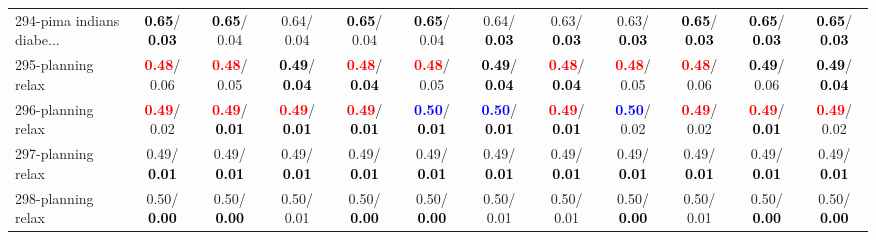 \begin{table}[h]
\begin{center}
{\begin{tabular}{lc|c|c|c|c|c|c|c|c|c|c}
294-pima indians diabe... & \textcolor{black}{\textbf{  0.65}}/\textcolor{black}{\textbf{  0.03}} & \textcolor{black}{\textbf{  0.65}}/  0.04 &   0.64/  0.04 & \textcolor{black}{\textbf{  0.65}}/  0.04 & \textcolor{black}{\textbf{  0.65}}/  0.04 &   0.64/\textcolor{black}{\textbf{  0.03}} &   0.63/\textcolor{black}{\textbf{  0.03}} &   0.63/\textcolor{black}{\textbf{  0.03}} & \textcolor{black}{\textbf{  0.65}}/\textcolor{black}{\textbf{  0.03}} & \textcolor{black}{\textbf{  0.65}}/\textcolor{black}{\textbf{  0.03}} & \textcolor{black}{\textbf{  0.65}}/\textcolor{black}{\textbf{  0.03}} \\
295-planning relax & \textcolor{red}{\textbf{  0.48}}/  0.06 & \textcolor{red}{\textbf{  0.48}}/  0.05 & \textcolor{black}{\textbf{  0.49}}/\textcolor{black}{\textbf{  0.04}} & \textcolor{red}{\textbf{  0.48}}/\textcolor{black}{\textbf{  0.04}} & \textcolor{red}{\textbf{  0.48}}/  0.05 & \textcolor{black}{\textbf{  0.49}}/\textcolor{black}{\textbf{  0.04}} & \textcolor{red}{\textbf{  0.48}}/\textcolor{black}{\textbf{  0.04}} & \textcolor{red}{\textbf{  0.48}}/  0.05 & \textcolor{red}{\textbf{  0.48}}/  0.06 & \textcolor{black}{\textbf{  0.49}}/  0.06 & \textcolor{black}{\textbf{  0.49}}/\textcolor{black}{\textbf{  0.04}} \\ \hline
296-planning relax & \textcolor{red}{\textbf{  0.49}}/  0.02 & \textcolor{red}{\textbf{  0.49}}/\textcolor{black}{\textbf{  0.01}} & \textcolor{red}{\textbf{  0.49}}/\textcolor{black}{\textbf{  0.01}} & \textcolor{red}{\textbf{  0.49}}/\textcolor{black}{\textbf{  0.01}} & \textcolor{blue}{\textbf{  0.50}}/\textcolor{black}{\textbf{  0.01}} & \textcolor{blue}{\textbf{  0.50}}/\textcolor{black}{\textbf{  0.01}} & \textcolor{red}{\textbf{  0.49}}/\textcolor{black}{\textbf{  0.01}} & \textcolor{blue}{\textbf{  0.50}}/  0.02 & \textcolor{red}{\textbf{  0.49}}/  0.02 & \textcolor{red}{\textbf{  0.49}}/\textcolor{black}{\textbf{  0.01}} & \textcolor{red}{\textbf{  0.49}}/  0.02 \\
297-planning relax &   0.49/\textcolor{black}{\textbf{  0.01}} &   0.49/\textcolor{black}{\textbf{  0.01}} &   0.49/\textcolor{black}{\textbf{  0.01}} &   0.49/\textcolor{black}{\textbf{  0.01}} &   0.49/\textcolor{black}{\textbf{  0.01}} &   0.49/\textcolor{black}{\textbf{  0.01}} &   0.49/\textcolor{black}{\textbf{  0.01}} &   0.49/\textcolor{black}{\textbf{  0.01}} &   0.49/\textcolor{black}{\textbf{  0.01}} &   0.49/\textcolor{black}{\textbf{  0.01}} &   0.49/\textcolor{black}{\textbf{  0.01}} \\
298-planning relax &   0.50/\textcolor{black}{\textbf{  0.00}} &   0.50/\textcolor{black}{\textbf{  0.00}} &   0.50/  0.01 &   0.50/\textcolor{black}{\textbf{  0.00}} &   0.50/\textcolor{black}{\textbf{  0.00}} &   0.50/  0.01 &   0.50/  0.01 &   0.50/\textcolor{black}{\textbf{  0.00}} &   0.50/  0.01 &   0.50/\textcolor{black}{\textbf{  0.00}} &   0.50/\textcolor{black}{\textbf{  0.00}} \\

\end{tabular}}
\end{center}
\end{table}
